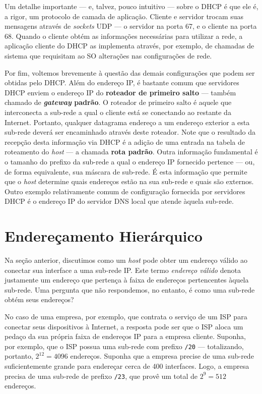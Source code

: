 \documentclass{article}
\begin{document}
Um detalhe importante --- e, talvez, pouco intuitivo --- sobre o DHCP é que ele é, a rigor, um protocolo de camada de aplicação. Cliente e servidor trocam suas mensagens através de \textit{sockets} UDP --- o servidor na porta 67, e o cliente na porta 68. Quando o cliente obtém as informações necessárias para utilizar a rede, a aplicação cliente do DHCP as implementa através, por exemplo, de chamadas de sistema que requisitam ao SO alterações nas configurações de rede.

Por fim, voltemos brevemente à questão das demais configurações que podem ser obtidas pelo DHCP. Além do endereço IP, é bastante comum que servidores DHCP enviem o endereço IP do \textbf{roteador de primeiro salto} --- também chamado de \textbf{\textit{gateway} padrão}. O roteador de primeiro salto é aquele que interconecta a sub-rede a qual o cliente está se conectando ao restante da Internet. Portanto, qualquer datagrama endereço a um endereço exterior a esta sub-rede deverá ser encaminhado através deste roteador. Note que o resultado da recepção desta informação via DHCP é a adição de uma entrada na tabela de roteamento do \textit{host} --- a chamada \textbf{rota padrão}. Outra informação fundamental é o tamanho do prefixo da sub-rede a qual o endereço IP fornecido pertence --- ou, de forma equivalente, sua máscara de sub-rede. É esta informação que permite que o \textit{host} determine quais endereços estão na sua sub-rede e quais são externos. Outro exemplo relativamente comum de configuração fornecida por servidores DHCP é o endereço IP do servidor DNS local que atende àquela sub-rede.

\section{Endereçamento Hierárquico}

Na seção anterior, discutimos como um \textit{host} pode obter um endereço válido ao conectar sua interface a uma sub-rede IP. Este termo \textit{endereço válido} denota justamente um endereço que pertença à faixa de endereços pertencentes àquela sub-rede. Uma pergunta que não respondemos, no entanto, é como uma sub-rede obtém seus endereços?

No caso de uma empresa, por exemplo, que contrata o serviço de um ISP para conectar seus dispositivos à Internet, a resposta pode ser que o ISP aloca um pedaço da sua própria faixa de endereços IP para a empresa cliente. Suponha, por exemplo, que o ISP possua uma sub-rede com prefixo \texttt{/20} --- totalizando, portanto, $2^{12} = 4096$ endereços. Suponha que a empresa precise de uma sub-rede suficientemente grande para endereçar cerca de 400 interfaces. Logo, a empresa precisa de uma sub-rede de prefixo \texttt{/23}, que provê um total de $2^9 = 512$ endereços.
\end{document}
